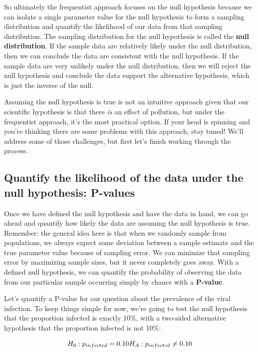 \documentclass[
]{book}
\begin{document}
So ultimately the frequentist approach focuses on the null hypothesis because we can isolate a single parameter value for the null hypothesis to form a sampling distribution and quantify the likelihood of our data from that sampling distribution. The sampling distribution for the null hypothesis is called the \textbf{null distribution}. If the sample data are relatively likely under the null distribution, then we can conclude the data are consistent with the null hypothesis. If the sample data are very unlikely under the null distribution, then we will reject the null hypothesis and conclude the data support the alternative hypothesis, which is just the inverse of the null.

Assuming the null hypothesis is true is not an intuitive approach given that our scientific hypothesis is that there \emph{is} an effect of pollution, but under the frequentist approach, it's the most practical option. If your head is spinning and you're thinking there are some problems with this approach, stay tuned! We'll address some of those challenges, but first let's finish working through the process.

\subsection{Quantify the likelihood of the data under the null hypothesis: P-values}\label{quantify-the-likelihood-of-the-data-under-the-null-hypothesis-p-values}

Once we have defined the null hypothesis and have the data in hand, we can go ahead and quantify how likely the data are assuming the null hypothesis is true. Remember: the general idea here is that when we randomly sample from populations, we always expect some deviation between a sample estimate and the true parameter value because of sampling error. We can minimize that sampling error by maximizing sample sizes, but it never completely goes away. With a defined null hypothesis, we can quantify the probability of observing the data from our particular sample occurring simply by chance with a \textbf{P-value}.

Let's quantify a P-value for our question about the prevalence of the viral infection. To keep things simple for now, we're going to test the null hypothesis that the proportion infected is exactly 10\%, with a two-sided alternative hypothesis that the proportion infected is not 10\%:

\[
H_0: p_{infected}=0.10 \\
H_A: p_{infected}\neq0.10
\]
\end{document}
